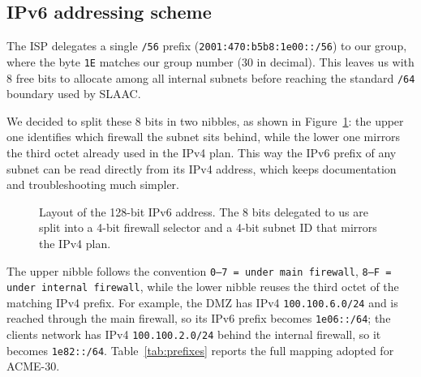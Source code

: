 \documentclass[twocolumn]{NobArticle}
\begin{document}
\subsection{IPv6 addressing scheme}

The ISP delegates a single \texttt{/56} prefix
(\texttt{2001:470:b5b8:1e00::/56}) to our group, where the byte \texttt{1E}
matches our group number (30 in decimal). This leaves us with 8 free bits to
allocate among all internal subnets before reaching the standard \texttt{/64}
boundary used by SLAAC.

We decided to split these 8 bits in two nibbles, as shown in
Figure~\ref{fig:bits}: the upper one identifies which firewall the subnet sits
behind, while the lower one mirrors the third octet already used in the IPv4
plan. This way the IPv6 prefix of any subnet can be read directly from its
IPv4 address, which keeps documentation and troubleshooting much simpler.

\begin{figure}[H]
\centering
{}
\caption{Layout of the 128-bit IPv6 address. The 8 bits delegated to us are
split into a 4-bit firewall selector and a 4-bit subnet ID that mirrors the
IPv4 plan.}
\label{fig:bits}
\end{figure}

The upper nibble follows the convention
\texttt{0--7 = under main firewall}, \texttt{8--F = under internal firewall},
while the lower nibble reuses the third octet of the matching IPv4 prefix.
For example, the DMZ has IPv4 \texttt{100.100.6.0/24} and is reached through
the main firewall, so its IPv6 prefix becomes \texttt{1e06::/64}; the clients
network has IPv4 \texttt{100.100.2.0/24} behind the internal firewall, so it
becomes \texttt{1e82::/64}. Table~\ref{tab:prefixes} reports the full mapping
adopted for ACME-30.
\end{document}
